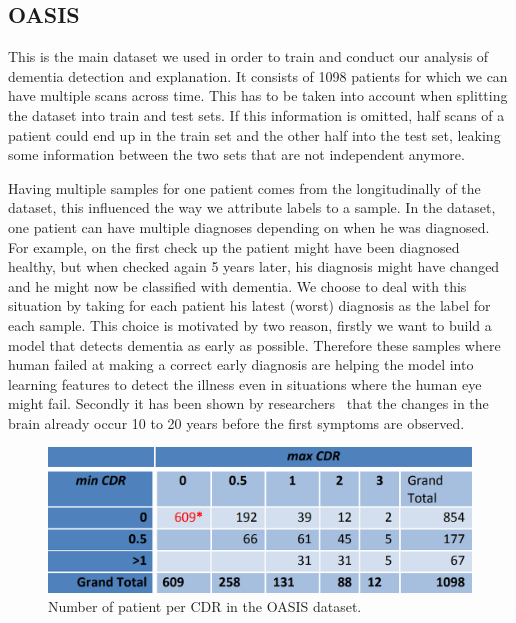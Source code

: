 \subsection{OASIS}
\label{sec:OASIS}
This is the main dataset we used in order to train and conduct our analysis of dementia detection and explanation. It consists of 1098 patients for which we can have multiple scans across time. This has to be taken into account when splitting the dataset into train and test sets. If this information is omitted, half scans of a patient could end up in the train set and the other half into the test set, leaking some information between the two sets that are not independent anymore.


Having multiple samples for one patient comes from the longitudinally of the dataset, this influenced the way we attribute labels to a sample. In the dataset, one patient can have multiple diagnoses depending on when he was diagnosed. For example, on the first check up the patient might have been diagnosed healthy, but when checked again 5 years later, his diagnosis might have changed and he might now be classified with dementia. We choose to deal with this situation by taking for each patient his latest (worst) diagnosis as the label for each sample. This choice is motivated by two reason, firstly we want to build a model that detects dementia as early as possible. Therefore these samples where human failed at making a correct early diagnosis are helping the model into learning features to detect the illness even in situations where the human eye might fail. Secondly it has been shown by researchers~\cite{change_in_brain_years_before} that the changes in the brain already occur 10 to 20 years before the first symptoms are observed.
\begin{figure}
 \centering
 \includegraphics[width=.9\linewidth]{figures/dataset/OASIS_CDR_table.png}
 \captionsetup{width=.9\linewidth}
 \caption[OASIS_CDR_table]{Number of patient per CDR in the OASIS dataset\footnotemark{}.}
 \label{fig:OASIS_CDR_table}
\end{figure}

